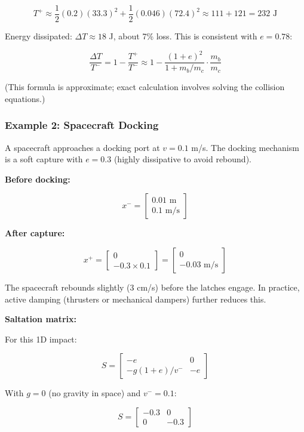 \documentclass[
  letterpaper,
  DIV=11,
  numbers=noendperiod]{scrartcl}
\begin{document}
\[
T^+ \approx \frac{1}{2}(0.2)(33.3)^2 + \frac{1}{2}(0.046)(72.4)^2 \approx 111 + 121 = 232 \text{ J}
\]

Energy dissipated: \(\Delta T \approx 18\) J, about 7\% loss. This is
consistent with \(e = 0.78\):

\[
\frac{\Delta T}{T^-} = 1 - \frac{T^+}{T^-} \approx 1 - \frac{(1 + e)^2}{1 + m_b/m_c} \cdot \frac{m_b}{m_c}
\]

(This formula is approximate; exact calculation involves solving the
collision equations.)

\subsubsection{Example 2: Spacecraft
Docking}\label{example-2-spacecraft-docking}

A spacecraft approaches a docking port at \(v = 0.1\) m/s. The docking
mechanism is a soft capture with \(e = 0.3\) (highly dissipative to
avoid rebound).

\textbf{Before docking:}

\[
x^- = \begin{bmatrix} 0.01 \text{ m} \\ 0.1 \text{ m/s} \end{bmatrix}
\]

\textbf{After capture:}

\[
x^+ = \begin{bmatrix} 0 \\ -0.3 \times 0.1 \end{bmatrix} = \begin{bmatrix} 0 \\ -0.03 \text{ m/s} \end{bmatrix}
\]

The spacecraft rebounds slightly (3 cm/s) before the latches engage. In
practice, active damping (thrusters or mechanical dampers) further
reduces this.

\textbf{Saltation matrix:}

For this 1D impact:

\[
S = \begin{bmatrix} -e & 0 \\ -g(1+e)/v^- & -e \end{bmatrix}
\]

With \(g = 0\) (no gravity in space) and \(v^- = 0.1\):

\[
S = \begin{bmatrix} -0.3 & 0 \\ 0 & -0.3 \end{bmatrix}
\]
\end{document}
